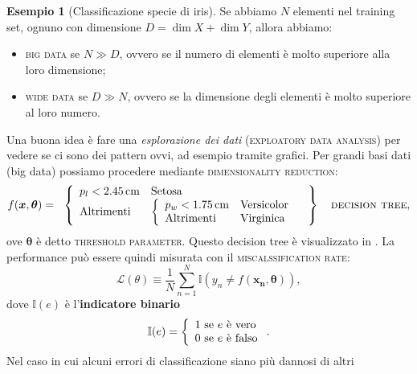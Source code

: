 \documentclass[10pt]{article}
\newcommand{\ve}[1]{\bm{#1}}
\newcommand{\im}[1]{\textsc{#1}}
\theoremstyle{definition}
\newtheorem{example}{Esempio}[section]
\begin{document}
\begin{example}[Classificazione specie di iris]
Se abbiamo \( N \) elementi nel training set, ognuno con dimensione \( D = \dim{X} +
\dim{Y} \), allora abbiamo:
\begin{itemize}
\item \im{big data} se \( N\gg D \), ovvero se il numero di elementi è molto superiore alla loro dimensione;
\item \im{wide data} se \( D\gg N \), ovvero se la dimensione degli elementi è molto superiore al loro numero.
\end{itemize}

Una buona idea è fare una \textit{esplorazione dei dati} (\im{exploatory data
analysis}) per vedere se ci sono dei pattern ovvi, ad esempio tramite grafici.
Per grandi basi dati (big data) possiamo procedere mediante \im{dimensionality
reduction}:
\begin{equation}
f(\ve{x}, \ve{\theta}) = \left.\begin{array}{l}
\left\{\begin{array}{ll}
p_l < \qty{2.45}{cm} & \text{Setosa} \\
\text{Altrimenti} & \left\{\begin{array}{ll}
p_w < \qty{1.75}{cm} & \text{Versicolor} \\
\text{Altrimenti} & \text{Virginica} \\
\end{array}\right.
\end{array}\right.
\end{array}\right\} \quad\text{\im{decision tree}},
\end{equation}
ove $\ve{\theta}$ è detto \im{threshold parameter}. Questo decision tree è
visualizzato in . La performance può essere quindi
misurata con il \im{miscalssification rate}:
\begin{equation}\label{eq:misclassification-rate-simple}
\mathcal{L}(\theta) \equiv \frac{1}{N}\sum_{n=1}^N \mathbb{I}\left( y_n \neq f(\ve{x_n}, \ve{\theta}) \right),
\end{equation}
dove $\mathbb{I}(e)$ è l'\textbf{indicatore binario}
\begin{equation}\label{eq:indicatore-binario}
\mathbb{I}(e) = \left\{\begin{array}{l@{\text{ se } e \text{ è }}l}
1 & \text{vero} \\
0 & \text{falso} \\
\end{array}\right..
\end{equation}
Nel caso in cui alcuni errori di classificazione siano più dannosi di altri

\end{example}
\end{document}
